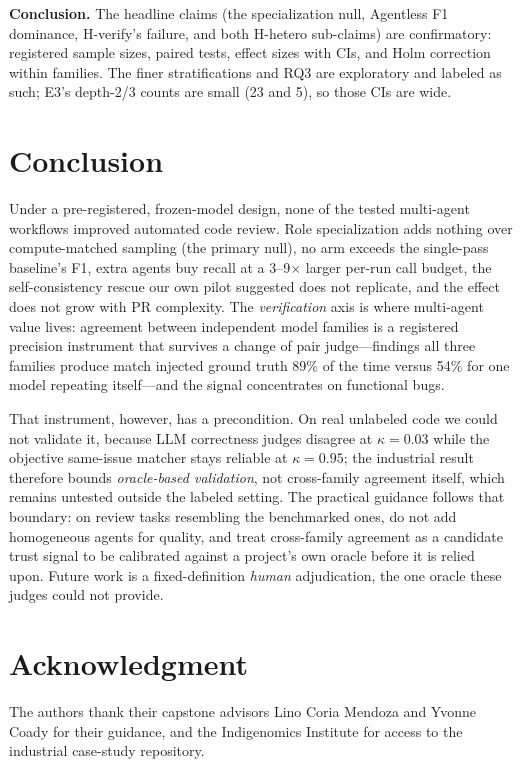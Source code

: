 \documentclass[conference]{IEEEtran}
\begin{document}
\textbf{Conclusion.} The headline claims (the specialization null, Agentless F1
dominance, H-verify's failure, and both H-hetero sub-claims) are confirmatory:
registered sample sizes, paired tests, effect sizes with CIs, and Holm correction
within families. The finer stratifications and RQ3 are exploratory and labeled as
such; E3's depth-2/3 counts are small (23 and 5), so those CIs are wide.

\section{Conclusion}

Under a pre-registered, frozen-model design, none of the tested multi-agent
workflows improved automated code review. Role specialization adds nothing over
compute-matched sampling (the primary null), no arm exceeds the single-pass
baseline's F1, extra agents buy recall at a 3--9$\times$ larger per-run call
budget, the self-consistency rescue our own pilot suggested does not replicate,
and the effect does not grow with PR complexity. The \emph{verification} axis is
where multi-agent value lives: agreement between independent model families is a
registered precision instrument that survives a change of pair
judge---findings all three families produce match injected ground truth 89\% of
the time versus 54\% for one model repeating itself---and the signal concentrates
on functional bugs.

That instrument, however, has a precondition. On real unlabeled code we could not
validate it, because LLM correctness judges disagree at $\kappa{=}0.03$ while the
objective same-issue matcher stays reliable at $\kappa{=}0.95$; the industrial
result therefore bounds \emph{oracle-based validation}, not cross-family
agreement itself, which remains untested outside the labeled setting. The
practical guidance follows that boundary: on review tasks resembling the
benchmarked ones, do not add homogeneous agents for quality, and treat
cross-family agreement as a candidate trust signal to be calibrated against a
project's own oracle before it is relied upon. Future work is a fixed-definition
\emph{human} adjudication, the one oracle these judges could not provide.

\section*{Acknowledgment}
The authors thank their capstone advisors Lino Coria Mendoza and Yvonne Coady for
their guidance, and the Indigenomics Institute for access to the industrial
case-study repository.
\end{document}
